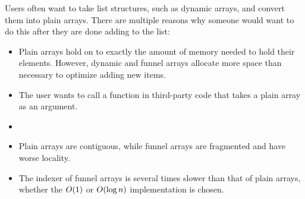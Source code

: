 \descriptn

Users often want to take list structures, such as dynamic arrays, and convert them into plain arrays. There are multiple reasons why someone would want to do this after they are done adding to the list:

\begin{itemize}
	\item Plain arrays hold on to exactly the amount of memory needed to hold their elements. However, dynamic and funnel arrays allocate more space than necessary to optimize adding new items.
	\item The user wants to call a function in third-party code that takes a plain array as an argument.
	\item
	\item Plain arrays are contiguous, while funnel arrays are fragmented and have worse locality.
	\item The indexer of funnel arrays is several times slower than that of plain arrays, whether the $O(1)$ or $O(\log n)$ implementation is chosen.
\end{itemize}